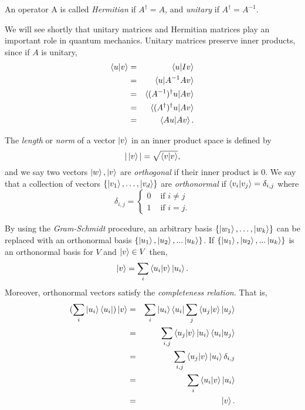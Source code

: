 \begin{definition}
\label{def herm}
An operator A is called \textit{Hermitian} if $A^\dagger = A$, and \textit{unitary} if $A^\dagger =A^{-1}$. 
\end{definition}
We will see shortly that unitary matrices and Hermitian matrices play an important role in quantum mechanics.  Unitary matrices preserve inner products, since if $A$ is unitary,
\begin{eqnarray}
\braket{u|v} &=& \braket{u|Iv}\\
&=& \braket{u|A^{-1}Av}\\
&=& \braket{(A^{-1})^\dagger u|Av}\\
&=& \braket{(A^\dagger)^\dagger u|Av}\\
&=& \braket{Au|Av}.
\end{eqnarray}

The \textit{length} or \textit{norm} of a vector $\ket{v}$ in an inner product space is defined by
\begin{equation}
    |\ket{v}|=\sqrt{\braket{v|v}},
\end{equation}
and we say two vectors $\ket{w}, \ket{v}$ are \textit{orthogonal} if their inner product is 0.  We say that a collection of vectors $\{\ket{v_1},\hdots,\ket{v_d}\}$  are \textit{orthonormal} if $\braket{v_i | v_j}={\delta}_{i,j}$ where 
$${\delta}_{i,j}=
\begin{cases} 0 & \textrm{ if }i\neq j\\
1 & \textrm{ if } i=j.
\end{cases}$$


By using the \textit{Gram-Schmidt} procedure, an arbitrary basis $\{\ket{w_1},\hdots,\ket{w_k}\}$ can be replaced with an orthonormal basis $\{\ket{u_1}, \ket{u_2}, ...\ket{u_k}\}$.  If $\{\ket{u_1}, \ket{u_2}, ...\ket{u_k}\}$ is an orthonormal basis for $V$ and $\ket{v} \in V$ then, 
$$\ket{v}=\sum\limits_i\braket{u_i|v}\ket{u_i} .$$
Moreover, orthonormal vectors satisfy the \textit{completeness relation}.  That is, 
\begin{eqnarray*}
    (\sum_i \ket{u_i}\bra{u_i})\ket{v}&=&
    \sum_i \ket{u_i}\bra{u_i}\sum_j \braket{u_j|v} \ket{u_j}\\
    &=& \sum_{i,j}\braket{u_j|v}\ket{u_i}\braket{u_i|u_j}\\
    &=& \sum_{i,j}\braket{u_j|v}\ket{u_i}\delta_{i,j}\\
    &=&\sum_i \braket{u_i|v}\ket{u_i}\\
    &=&\ket{v}.
\end{eqnarray*}


